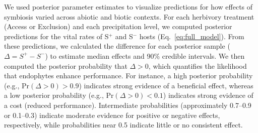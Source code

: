 \documentclass[12pt]{article}\usepackage[]{graphicx}\usepackage[dvipsnames]{xcolor}
\newcommand{\tom}[2]{{\color{red}{#1}}\footnote{\textit{\color{red}{#2}}}}
\begin{document}
We used posterior parameter estimates to visualize predictions for how effects of symbiosis varied across abiotic and biotic contexts. 
For each herbivory treatment (Access or Exclusion) and each precipitation level, we computed posterior predictions for the vital rates of S$^+$ and S$^-$ hosts (Eq.~\ref{eq:full_model}).  
From these predictions, we calculated the difference for each posterior sample ($\Delta = S^+ - S^-$) to estimate median effects and 90\% credible intervals.  
We then computed the posterior probability that $\Delta > 0$, which quantifies the likelihood that endophytes enhance performance. 
For instance, a high posterior probability (e.g., Pr$(\Delta>0) >0.9$) indicates strong evidence of a beneficial effect, whereas a low posterior probability (e.g., Pr$(\Delta>0) <0.1$) indicates strong evidence of a cost (reduced performance). 
Intermediate probabilities (approximately 0.7–0.9 or 0.1–0.3) indicate moderate evidence for positive or negative effects, respectively, while probabilities near 0.5 indicate little or no consistent effect.
\end{document}
